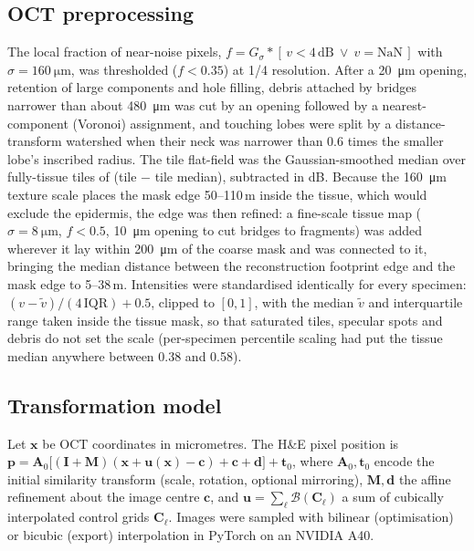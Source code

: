 \documentclass[9pt,twocolumn]{extarticle}
\begin{document}
\subsection{OCT preprocessing} The local fraction of near-noise pixels, $f=G_{\sigma}\ast[\,v<4\,\mathrm{dB}\ \vee\ v=\mathrm{NaN}\,]$ with $\sigma=\SI{160}{\micro\metre}$, was thresholded ($f<0.35$) at 1/4 resolution. After a \SI{20}{\micro\metre} opening, retention of large components and hole filling, debris attached by bridges narrower than about \SI{480}{\micro\metre} was cut by an opening followed by a nearest-component (Voronoi) assignment, and touching lobes were split by a distance-transform watershed\cite{beucher1993} when their neck was narrower than 0.6 times the smaller lobe's inscribed radius. The tile flat-field was the Gaussian-smoothed median over fully-tissue tiles of (tile $-$ tile median), subtracted in dB. Because the \SI{160}{\micro\metre} texture scale places the mask edge 50--110\,\textmu m inside the tissue, which would exclude the epidermis, the edge was then refined: a fine-scale tissue map ($\sigma=\SI{8}{\micro\metre}$, $f<0.5$, \SI{10}{\micro\metre} opening to cut bridges to fragments) was added wherever it lay within \SI{200}{\micro\metre} of the coarse mask and was connected to it, bringing the median distance between the reconstruction footprint edge and the mask edge to 5--38\,\textmu m. Intensities were standardised identically for every specimen: $(v-\tilde v)/(4\,\mathrm{IQR})+0.5$, clipped to $[0,1]$, with the median $\tilde v$ and interquartile range taken inside the tissue mask, so that saturated tiles, specular spots and debris do not set the scale (per-specimen percentile scaling had put the tissue median anywhere between 0.38 and 0.58).

\subsection{Transformation model} Let $\mathbf{x}$ be OCT coordinates in micrometres. The H\&E pixel position is $\mathbf{p}=\mathbf{A}_0\big[(\mathbf{I}+\mathbf{M})(\mathbf{x}+\mathbf{u}(\mathbf{x})-\mathbf{c})+\mathbf{c}+\mathbf{d}\big]+\mathbf{t}_0$, where $\mathbf{A}_0,\mathbf{t}_0$ encode the initial similarity transform (scale, rotation, optional mirroring), $\mathbf{M},\mathbf{d}$ the affine refinement about the image centre $\mathbf{c}$, and $\mathbf{u}=\sum_\ell \mathcal{B}(\mathbf{C}_\ell)$ a sum of cubically interpolated control grids $\mathbf{C}_\ell$. Images were sampled with bilinear (optimisation) or bicubic (export) interpolation in PyTorch\cite{paszke2019} on an NVIDIA A40.
\end{document}
